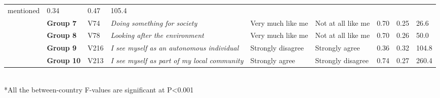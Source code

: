 \documentclass[12pt, a4paper]{article}
\begin{document}
\begin{table}
\begin{adjustbox}{width=\textwidth}
\begin{tabular}[]{p{}lp{}p{}lllll}
mentioned & 0.34 & 0.47 & 105.4\tabularnewline
& \textbf{Group 7} & V74 & \emph{Doing something for society} & Very
much like me & Not at all like me & 0.70 & 0.25 & 26.6\tabularnewline
& \textbf{Group 8} & V78 & \emph{Looking after the environment} & Very
much like me & Not at all like me & 0.70 & 0.26 & 50.0\tabularnewline
& \textbf{Group 9} & V216 & \emph{I see myself as an autonomous
individual} & Strongly disagree & Strongly agree & 0.36 & 0.32 &
104.8\tabularnewline
& \textbf{Group 10} & V213 & \emph{I see myself as part of my local
community} & Strongly agree & Strongly disagree & 0.74 & 0.27 &
260.4\tabularnewline
\bottomrule
\end{tabular}
\end{adjustbox}
\\
\footnotesize{*All the between-country F-values are significant at P<0.001}
\end{table}
\end{document}
